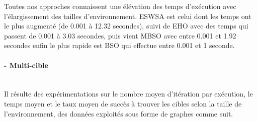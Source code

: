 	Toutes nos approches connaissent une élévation des temps d'exécution avec l'élargissement des tailles d'environnement. ESWSA est celui dont les temps ont le plus augmenté (de 0.001 à 12.32 secondes), suivi de EHO avec des temps qui passent de 0.001 à 3.03 secondes, puis vient MBSO avec entre 0.001 et 1.92 secondes enfin le plus rapide est BSO qui effectue entre 0.001 et 1 seconde.
	


\noindent
\hspace{-0.5cm}
\begin{minipage}[t]{0.55\textwidth}
	\captionsetup{width=0.8\linewidth}
	\centering{}
	\label{IS1c}
\end{minipage}\hfill
\begin{minipage}[t]{0.55\textwidth}
	\captionsetup{width=0.8\linewidth}
	\centering{}
	\label{tS1c}
\end{minipage}\hfill






\paragraph{- Multi-cible}
\textbf{ }\\
Il résulte des expérimentations sur le nombre moyen d'itération par exécution, le temps moyen et le taux moyen de succès à trouver les cibles selon la taille de l'environnement, des données exploités sous forme de graphes comme suit.

